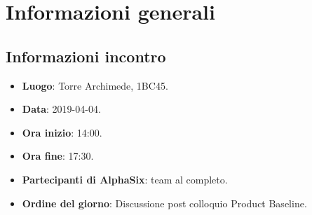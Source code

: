 \newcommand{\documento}{\VI}
\newcommand{\nomedocumentofisico}{VI\_2019-04-04.pdf}
\newcommand{\redazione}{\TG}
\newcommand{\verifica}{\SG}
\newcommand{\approvazione}{\NC}
\newcommand{\versione}{1.0.0}
\newcommand{\uso}{Interno}
\newcommand{\destinateTo}{\gruppo}
\newcommand{\datacreazione}{05 aprile 2019}
\newcommand{\datamodifica}{07 aprile 2019}
\newcommand{\stato}{Approvato}

\def\TABELLE{false}	%
\def\FIGURE{false} 	%






    

    	
    
    \section{Informazioni generali}
		\subsection{Informazioni incontro}
			\begin{itemize}
				\item \textbf{Luogo}: Torre Archimede, 1BC45.
				\item \textbf{Data}: 2019-04-04.
				\item \textbf{Ora inizio}: 14:00.
				\item \textbf{Ora fine}: 17:30.
				\item \textbf{Partecipanti di AlphaSix}: team al completo.
				\item \textbf{Ordine del giorno}: Discussione post colloquio Product Baseline.
			\end{itemize}

